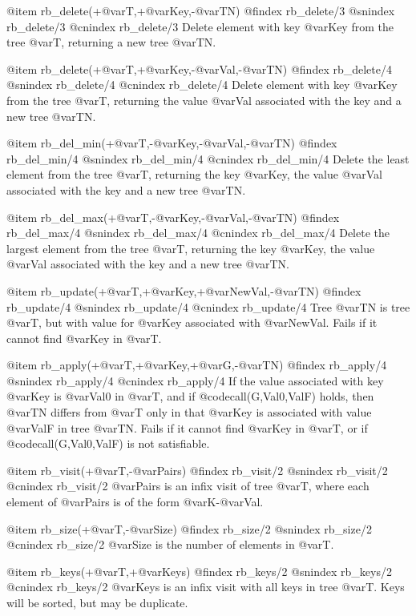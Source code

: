 {{{{{{{{{@item rb_delete(+@var{T},+@var{Key},-@var{TN})
@findex rb_delete/3
@snindex rb_delete/3
@cnindex rb_delete/3
Delete element with key @var{Key} from the tree @var{T}, returning a new
tree @var{TN}.

@item rb_delete(+@var{T},+@var{Key},-@var{Val},-@var{TN})
@findex rb_delete/4
@snindex rb_delete/4
@cnindex rb_delete/4
Delete element with key @var{Key} from the tree @var{T}, returning the
value @var{Val} associated with the key and a new tree @var{TN}.

@item rb_del_min(+@var{T},-@var{Key},-@var{Val},-@var{TN})
@findex rb_del_min/4
@snindex rb_del_min/4
@cnindex rb_del_min/4
Delete the least element from the tree @var{T}, returning the key
@var{Key}, the value @var{Val} associated with the key and a new tree
@var{TN}.

@item rb_del_max(+@var{T},-@var{Key},-@var{Val},-@var{TN})
@findex rb_del_max/4
@snindex rb_del_max/4
@cnindex rb_del_max/4
Delete the largest element from the tree @var{T}, returning the key
@var{Key}, the value @var{Val} associated with the key and a new tree
@var{TN}.

@item rb_update(+@var{T},+@var{Key},+@var{NewVal},-@var{TN})
@findex rb_update/4
@snindex rb_update/4
@cnindex rb_update/4
Tree @var{TN} is tree @var{T}, but with value for @var{Key} associated
with @var{NewVal}. Fails if it cannot find @var{Key} in @var{T}.

@item rb_apply(+@var{T},+@var{Key},+@var{G},-@var{TN})
@findex rb_apply/4
@snindex rb_apply/4
@cnindex rb_apply/4
If the value associated with key @var{Key} is @var{Val0} in @var{T}, and
if @code{call(G,Val0,ValF)} holds, then @var{TN} differs from
@var{T} only in that @var{Key} is associated with value @var{ValF} in
tree @var{TN}. Fails if it cannot find @var{Key} in @var{T}, or if
@code{call(G,Val0,ValF)} is not satisfiable.

@item rb_visit(+@var{T},-@var{Pairs})
@findex rb_visit/2
@snindex rb_visit/2
@cnindex rb_visit/2
@var{Pairs} is an infix visit of tree @var{T}, where each element of
@var{Pairs} is of the form  @var{K}-@var{Val}.

@item rb_size(+@var{T},-@var{Size})
@findex rb_size/2
@snindex rb_size/2
@cnindex rb_size/2
@var{Size} is the number of elements in @var{T}.

@item rb_keys(+@var{T},+@var{Keys})
@findex rb_keys/2
@snindex rb_keys/2
@cnindex rb_keys/2
@var{Keys} is an infix visit with all keys in tree @var{T}. Keys will be
sorted, but may be duplicate.

}}}}}}}}}
